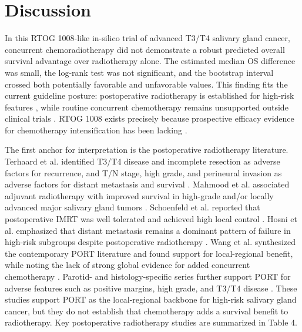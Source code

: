 \documentclass[10pt,twocolumn]{article}
\begin{document}
\section{Discussion}

In this RTOG 1008-like in-silico trial of advanced T3/T4 salivary gland cancer, concurrent chemoradiotherapy did not demonstrate a robust predicted overall survival advantage over radiotherapy alone. The estimated median OS difference was small, the log-rank test was not significant, and the bootstrap interval crossed both potentially favorable and unfavorable values. This finding fits the current guideline posture: postoperative radiotherapy is established for high-risk features \cite{ref1,ref2}, while routine concurrent chemotherapy remains unsupported outside clinical trials \cite{ref1,ref2}. RTOG 1008 exists precisely because prospective efficacy evidence for chemotherapy intensification has been lacking \cite{ref22,ref23,ref24}.


The first anchor for interpretation is the postoperative radiotherapy literature. Terhaard et al. identified T3/T4 disease and incomplete resection as adverse factors for recurrence, and T/N stage, high grade, and perineural invasion as adverse factors for distant metastasis and survival \cite{ref5}. Mahmood et al. associated adjuvant radiotherapy with improved survival in high-grade and/or locally advanced major salivary gland tumors \cite{ref7}. Schoenfeld et al. reported that postoperative IMRT was well tolerated and achieved high local control \cite{ref8}. Hosni et al. emphasized that distant metastasis remains a dominant pattern of failure in high-risk subgroups despite postoperative radiotherapy \cite{ref9}. Wang et al. synthesized the contemporary PORT literature and found support for local-regional benefit, while noting the lack of strong global evidence for added concurrent chemotherapy \cite{ref10}. Parotid- and histology-specific series further support PORT for adverse features such as positive margins, high grade, and T3/T4 disease \cite{ref33,ref34}. These studies support PORT as the local-regional backbone for high-risk salivary gland cancer, but they do not establish that chemotherapy adds a survival benefit to radiotherapy. Key postoperative radiotherapy studies are summarized in Table 4.
\end{document}
